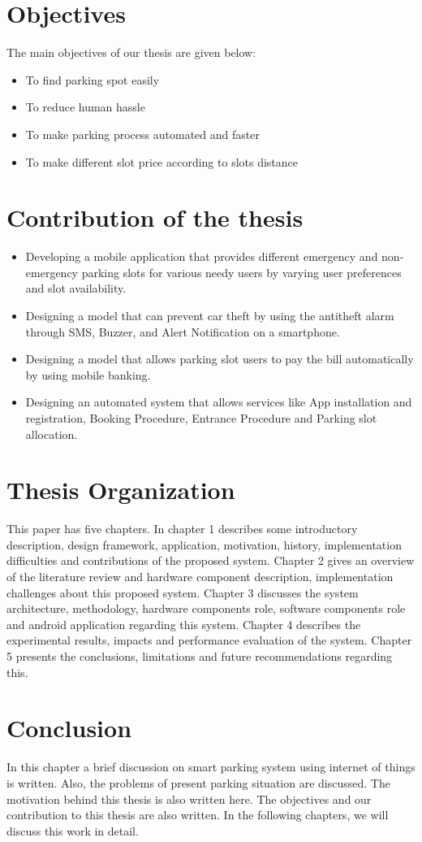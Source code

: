 \section{Objectives}
The main objectives of our thesis are given below:
\begin{itemize}
    \item To find parking spot easily 
    \item To reduce human hassle
    \item To make parking process automated and faster
    \item To make different slot price according to slots distance 
\end{itemize}

\section{Contribution of the thesis}
\begin{itemize}
    \item Developing a mobile application that provides different emergency and non-emergency parking slots for various needy users by varying user preferences and slot availability.
    \item Designing a model that can prevent car theft by using the antitheft alarm through SMS, Buzzer, and Alert Notification on a smartphone.
    \item Designing a model that allows parking slot users to pay the bill automatically by using mobile banking.
    \item Designing an automated system that allows services like App installation and registration, Booking Procedure, Entrance Procedure and Parking slot allocation.
\end{itemize}

\section{Thesis Organization}
This paper has five chapters. In chapter 1 describes some introductory description, design framework, application, motivation, history, implementation difficulties and contributions of the proposed system. Chapter 2 gives an overview
of the literature review and hardware component description, implementation
challenges about this proposed system. Chapter 3 discusses the system architecture, methodology, hardware components role, software components role and
android application regarding this system. Chapter 4 describes the experimental
results, impacts and performance evaluation of the system. Chapter 5 presents
the conclusions, limitations and future recommendations regarding this.

\section{Conclusion}
In this chapter a brief discussion on smart parking system using internet of things is written. Also, the problems of present parking situation are discussed. The motivation behind this thesis is also written here. The objectives and our contribution to this thesis are also written. In the following chapters, we will discuss this work in detail.  